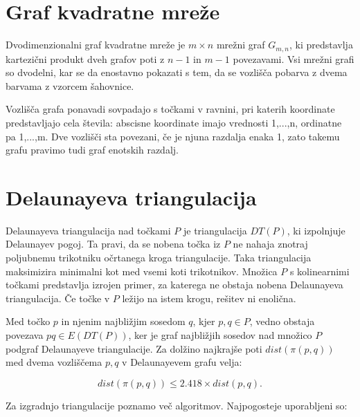 \documentclass[a4paper, 12pt]{book}
\begin{document}
\section{Graf kvadratne mreže}
\label{grid-chapter}
Dvodimenzionalni graf kvadratne mreže je $m \times n$ mrežni graf $G_{m,n}$, ki predstavlja kartezični produkt dveh grafov poti z $n-1$ in $m-1$ povezavami. Vsi mrežni grafi so dvodelni, kar se da enostavno pokazati s tem, da se vozlišča pobarva z dvema barvama z vzorcem šahovnice.


Vozlišča grafa ponavadi sovpadajo s točkami v ravnini, pri katerih koordinate predstavljajo cela števila: abscisne koordinate imajo vrednosti 1,...,n, ordinatne pa 1,...,m. Dve vozlišči sta povezani, če je njuna razdalja enaka 1, zato takemu grafu pravimo tudi graf enotskih razdalj.


\section{Delaunayeva triangulacija}
Delaunayeva triangulacija nad točkami $P$ je triangulacija $DT(P)$, ki izpolnjuje Delaunayev pogoj. Ta pravi, da se nobena točka iz $P$ ne nahaja znotraj poljubnemu trikotniku očrtanega kroga triangulacije. Taka triangulacija
maksimizira minimalni kot med vsemi koti trikotnikov. Množica $P$ s kolinearnimi točkami predstavlja izrojen primer, za katerega ne obstaja nobena Delaunayeva triangulacija. Če točke v $P$ ležijo na istem krogu, rešitev ni enolična.

Med točko $p$ in njenim najbližjim sosedom $q$, kjer $p,q\in P$, vedno obstaja povezava $pq\in E(DT(P))$, ker je graf najbližjih sosedov nad množico $P$ podgraf Delaunayeve triangulacije. Za dolžino najkrajše poti $dist(\pi (p,q))$ med dvema 
vozliščema $p,q$ v Delaunayevem grafu velja:

\begin{equation}
dist(\pi (p,q)) \leq 2.418\times dist(p,q).
\end{equation}

Za izgradnjo triangulacije poznamo več algoritmov. Najpogosteje uporabljeni so: 
\end{document}
